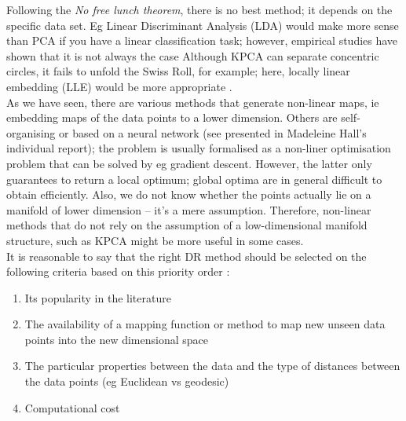 \documentclass[journal, a4paper]{IEEEtran}
\begin{document}
Following the \textit{No free lunch theorem}, there is no best method; it depends on the specific data set.
Eg Linear Discriminant Analysis (LDA) would make more sense than PCA if you have a linear classification task; however, empirical studies have shown that it is not always the case \cite{github} Although KPCA can separate concentric circles, it fails to unfold the Swiss Roll, for example; here, locally linear embedding (LLE) would be more appropriate \cite{github}. \\
As we have seen, there are various methods that generate non-linear maps, ie embedding maps of the data points to a lower dimension. Others are self-organising or based on a neural network (see \cite{hopland} presented in Madeleine Hall's individual report); the problem is usually formalised as a non-liner optimisation problem that can be solved by eg gradient descent. However, the latter only guarantees to return a local optimum; global optima are in general difficult to obtain efficiently. Also, we do not know whether the points actually lie on a manifold of lower dimension -- it's a mere assumption.
Therefore, non-linear methods that do not rely on the assumption of a low-dimensional manifold structure, such as KPCA might be more useful in some cases. 
\\
It is reasonable to say that the right DR method should be selected on the following criteria based on this priority order \cite{banda}:
\begin{enumerate}
\item Its popularity in the literature
\item The availability of a mapping function or method to map new unseen data points into the new dimensional space
\item The particular properties between the data and the type of distances between the data points (eg Euclidean vs geodesic)
\item Computational cost
\end{enumerate}

\end{document}
